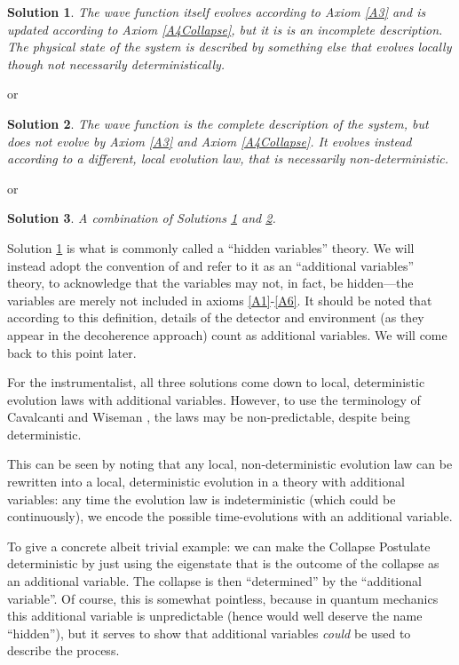 \documentclass[superscriptaddress,floatfix,nofootinbib,12pt]{revtex4-2}
\newtheorem{soln}{Solution}
\begin{document}
\begin{soln}\label{S1}
  The wave function itself evolves according to Axiom \ref{A3} and is updated according to Axiom \ref{A4Collapse}, but it is is an incomplete description. The physical state of the system is described by something else that evolves locally though not necessarily deterministically.
\end{soln}

or

\begin{soln}\label{S2}
  The wave function is the complete description of the system, but does not evolve by Axiom \ref{A3} and Axiom \ref{A4Collapse}. It evolves instead according to a different, local evolution law, that is necessarily non-deterministic.
\end{soln}

or

\begin{soln}\label{S3}
  A combination of Solutions \ref{S1} and \ref{S2}.
\end{soln}

Solution \ref{S1} is what is commonly called a ``hidden variables'' theory. We will instead adopt the convention of \cite{Maudlin1995ThreeMP} and refer to it as an ``additional variables'' theory, to acknowledge that the variables may not, in fact, be hidden---the variables are merely not included in axioms \ref{A1}-\ref{A6}. It should be noted that according to this definition, details of the detector and environment (as they appear in the decoherence approach) count as additional variables. We will come back to this point later. 

For the instrumentalist, all three solutions come down to local, deterministic evolution laws with additional variables. However, to use the terminology of Cavalcanti and Wiseman \cite{cavalcanti2012bell}, the laws may be non-predictable, despite being deterministic. 

This can be seen by noting that any local, non-deterministic evolution law can be rewritten into a local, deterministic evolution in a theory with additional variables: any time the evolution law is indeterministic (which could be continuously), we encode the possible time-evolutions with an additional variable. 

To give a concrete albeit trivial example: we can make the Collapse Postulate deterministic by just using the eigenstate that is the outcome of the collapse as an additional variable. The collapse is then ``determined'' by the ``additional variable''. 
Of course, this is somewhat pointless, because in quantum mechanics this additional variable is unpredictable (hence would well deserve the name ``hidden''), but it serves to show that additional variables \emph{could} be used to describe the process.
\end{document}
